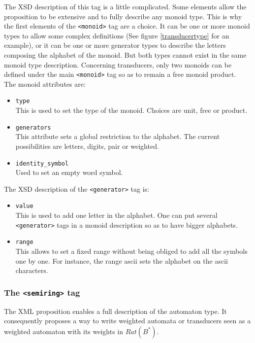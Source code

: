 \documentclass[a4paper]{article}
\def\monoidtag{\texttt{<monoid>}}
\def\semiringtag{\texttt{<semiring>}}
\def\generatortag{\texttt{<generator>}}
\begin{document}
The XSD description of this tag is a little complicated. Some elements allow
the proposition to be extensive and to fully describe any monoid type. This is
why the first elements of the \monoidtag{} tag are a choice. It can be one or
more monoid types to allow some complex definitions (See figure
\ref{transducertype} for an example), or it can be one or more generator types
to describe the letters composing the alphabet of the monoid. But both types
cannot exist in the same monoid type description. Concerning transducers, only
two monoids can be defined under the main \monoidtag{} tag so as to remain a
free monoid product.\\

The monoid attributes are:
\begin{itemize}
  \item \texttt{type}\\
This is used to set the type of the monoid. Choices are unit, free or product.
  \item \texttt{generators}\\
This attribute sets a global restriction to the alphabet. The current possibilities
are letters, digits, pair or weighted.
  \item \texttt{identity\_symbol}\\
Used to set an empty word symbol.
\end{itemize}
\newpage

The XSD description of the \generatortag{} tag is:
\begin{itemize}
  \item \texttt{value}\\
This is used to add one letter in the alphabet. One can put several
\generatortag{} tags in a monoid description so as to have bigger alphabets.
  \item \texttt{range}\\
This allows to set a fixed range without being obliged to add all the symbols
one by one. For instance, the range ascii sets the alphabet on the ascii
characters.
\end{itemize}

\subsubsection{The \semiringtag{} tag}

The XML proposition enables a full description of the automaton type.
It consequently proposes a way to write weighted automata or transducers
seen as a weighted automaton with its weights in $Rat(B^*)$.\\
\end{document}
